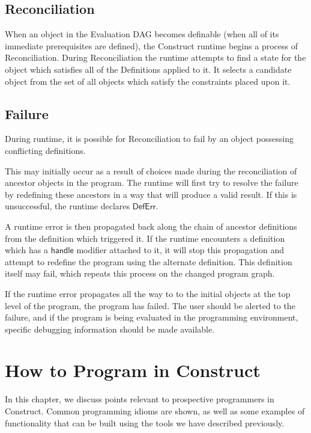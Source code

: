 \documentclass[twoside,openright,11pt]{report}
\begin{document}
\section{Reconciliation}
\label{sec:reconc}

When an object in the Evaluation DAG becomes definable (when all of its immediate prerequisites are defined), the Construct runtime begins a process of Reconciliation. 
During Reconciliation the runtime attempts to find a state for the object which satisfies all of the Definitions applied to it. 
It selects a candidate object from the set of all objects which satisfy the constraints placed upon it.

\section{Failure}
\label{sec:failure}

During runtime, it is possible for Reconciliation to fail by an object possessing conflicting definitions. 

This may initially occur as a result of choices made during the reconciliation of ancestor objects in the program. 
The runtime will first try to resolve the failure by redefining these ancestors in a way that will produce a valid result. 
If this is unsuccessful, the runtime declares $\mathsf{DefErr}$.

A runtime error is then propagated back along the chain of ancestor definitions from the definition which triggered it. 
If the runtime encounters a definition which has a $\mathsf{handle}$ modifier attached to it, it will stop this propagation and attempt to redefine the program using the alternate definition.
This definition itself may fail, which repeats this process on the changed program graph.

If the runtime error propagates all the way to to the initial objects at the top level of the program, the program has failed. 
The user should be alerted to the failure, and if the program is being evaluated in the programming environment, specific debugging information should be made available.

\chapter{How to Program in Construct}
\label{chap:howto}

In this chapter, we discuss points relevant to prospective programmers in Construct. Common programming idioms are shown, as well as some examples of functionality that can be built using the tools we have described previously.
\end{document}
